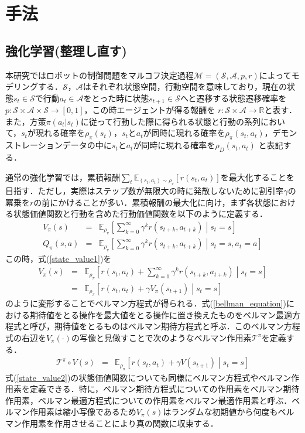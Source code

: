 \documentclass[dvipdfmx]{ampbt_nomag}
\begin{document}
\clearpage
\section{手法}\label{sec-method}
\subsection{強化学習(整理し直す)}
本研究ではロボットの制御問題をマルコフ決定過程$\mathcal{M} = (\mathcal{S},\mathcal{A},p,r)$によってモデリングする．$\mathcal{S}$，$\mathcal{A}$はそれぞれ状態空間，行動空間を意味しており，現在の状態$s_t \in \mathcal{S}$で行動$a_t \in \mathcal{A}$をとった時に状態$s_{t+1}\in\mathcal{S}$へと遷移する状態遷移確率を$ p:\mathcal{S}\times\mathcal{A}\times\mathcal{S}\rightarrow[0,1]$，この時エージェントが得る報酬を $r:\mathcal{S}\times\mathcal{A}\rightarrow\mathbb{R}$と表す．また，方策$\pi(a_t|s_t)$に従って行動した際に得られる状態と行動の系列において，$s_t$が現れる確率を$\rho_\pi(s_t)$，$s_t$と$a_t$が同時に現れる確率を$\rho_\pi(s_t,a_t)$，デモンストレーションデータの中に$s_t$と$a_t$が同時に現れる確率を$\rho_D(s_t,a_t)$ と表記する．

通常の強化学習では，累積報酬$\sum_t \mathbb{E}_{(s_t,a_t)\sim\rho_\pi}[r(s_t, a_t)]$を最大化することを目指す．ただし，実際はステップ数が無限大の時に発散しないために割引率$\gamma$の冪乗を$r$の前にかけることが多い．累積報酬の最大化に向け，まず各状態における状態価値関数と行動を含めた行動価値関数を以下のように定義する．
\begin{eqnarray} \label{state_value1}
  V_\pi(s) &=& \mathbb{E}_{\rho_\pi} \left[\sum^{\infty}_{k=0}\gamma^kr(s_{t+k},a_{t+k}) \middle|s_t = s\right] \\
  \label{state_value2}
  Q_\pi(s,a) &=& \mathbb{E}_{\rho_\pi} \left[\sum^{\infty}_{k=0}\gamma^kr(s_{t+k},a_{t+k}) \middle|s_t = s, a_t = a \right]
\end{eqnarray}
この時，式(\ref{state_value1})を
\begin{eqnarray} \label{bellman_equation}
  V_\pi(s) &=& \mathbb{E}_{\rho_\pi} \left[ r(s_t,a_t) + \sum^{\infty}_{k=1} \gamma^{k}r(s_{t+k},a_{t+k}) \middle|s_t = s\right] \\ \nonumber
  &=& \mathbb{E}_{\rho_\pi} \left[ r(s_t,a_t) + \gamma V_\pi(s_{t+1}) \middle|s_t = s\right]
\end{eqnarray}
のように変形することでベルマン方程式が得られる．式(\ref{bellman_equation})における期待値をとる操作を最大値をとる操作に置き換えたものをベルマン最適方程式と呼び，期待値をとるものはベルマン期待方程式と呼ぶ．このベルマン方程式の右辺を$V_\pi(\cdot)$の写像と見做すことで次のようなベルマン作用素$\mathcal{T}^\pi$を定義する．
\begin{eqnarray} \label{bellman_operator}
  \mathcal{T}^\pi\circ V(s) &=&  \mathbb{E}_{\rho_\pi} \left[ r(s_t,a_t) + \gamma V(s_{t+1}) \middle|s_t = s\right]
\end{eqnarray}
式(\ref{state_value2})の状態価値関数についても同様にベルマン方程式やベルマン作用素を定義できる．特に，ベルマン期待方程式についての作用素をベルマン期待作用素，ベルマン最適方程式についての作用素をベルマン最適作用素と呼ぶ．ベルマン作用素は縮小写像であるため$V_\pi(s)$はランダムな初期値から何度もベルマン作用素を作用させることにより真の関数に収束する．
\end{document}
